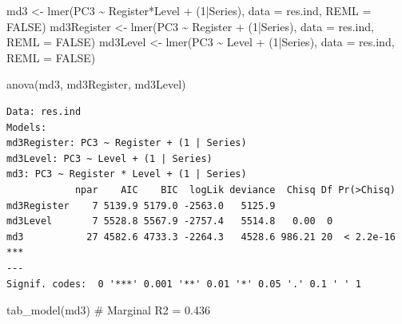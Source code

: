 \documentclass[
  letterpaper,
  DIV=11,
  numbers=noendperiod]{scrreprt}
\newenvironment{Shaded}{\begin{snugshade}}{\end{snugshade}}
\newcommand{\AttributeTok}[1]{\textcolor[rgb]{0.40,0.45,0.13}{#1}}
\newcommand{\CommentTok}[1]{\textcolor[rgb]{0.37,0.37,0.37}{#1}}
\newcommand{\ConstantTok}[1]{\textcolor[rgb]{0.56,0.35,0.01}{#1}}
\newcommand{\DecValTok}[1]{\textcolor[rgb]{0.68,0.00,0.00}{#1}}
\newcommand{\FunctionTok}[1]{\textcolor[rgb]{0.28,0.35,0.67}{#1}}
\newcommand{\NormalTok}[1]{\textcolor[rgb]{0.00,0.23,0.31}{#1}}
\newcommand{\OtherTok}[1]{\textcolor[rgb]{0.00,0.23,0.31}{#1}}
\newcommand{\SpecialCharTok}[1]{\textcolor[rgb]{0.37,0.37,0.37}{#1}}
\begin{document}
\begin{Shaded}
\begin{Highlighting}[]
\NormalTok{md3 }\OtherTok{\textless{}{-}} \FunctionTok{lmer}\NormalTok{(PC3 }\SpecialCharTok{\textasciitilde{}}\NormalTok{ Register}\SpecialCharTok{*}\NormalTok{Level }\SpecialCharTok{+}\NormalTok{ (}\DecValTok{1}\SpecialCharTok{|}\NormalTok{Series), }\AttributeTok{data =}\NormalTok{ res.ind, }\AttributeTok{REML =} \ConstantTok{FALSE}\NormalTok{)}
\NormalTok{md3Register }\OtherTok{\textless{}{-}} \FunctionTok{lmer}\NormalTok{(PC3 }\SpecialCharTok{\textasciitilde{}}\NormalTok{ Register }\SpecialCharTok{+}\NormalTok{ (}\DecValTok{1}\SpecialCharTok{|}\NormalTok{Series), }\AttributeTok{data =}\NormalTok{ res.ind, }\AttributeTok{REML =} \ConstantTok{FALSE}\NormalTok{)}
\NormalTok{md3Level }\OtherTok{\textless{}{-}} \FunctionTok{lmer}\NormalTok{(PC3 }\SpecialCharTok{\textasciitilde{}}\NormalTok{ Level }\SpecialCharTok{+}\NormalTok{ (}\DecValTok{1}\SpecialCharTok{|}\NormalTok{Series), }\AttributeTok{data =}\NormalTok{ res.ind, }\AttributeTok{REML =} \ConstantTok{FALSE}\NormalTok{)}

\FunctionTok{anova}\NormalTok{(md3, md3Register, md3Level)}
\end{Highlighting}
\end{Shaded}

\begin{verbatim}
Data: res.ind
Models:
md3Register: PC3 ~ Register + (1 | Series)
md3Level: PC3 ~ Level + (1 | Series)
md3: PC3 ~ Register * Level + (1 | Series)
            npar    AIC    BIC  logLik deviance  Chisq Df Pr(>Chisq)    
md3Register    7 5139.9 5179.0 -2563.0   5125.9                         
md3Level       7 5528.8 5567.9 -2757.4   5514.8   0.00  0               
md3           27 4582.6 4733.3 -2264.3   4528.6 986.21 20  < 2.2e-16 ***
---
Signif. codes:  0 '***' 0.001 '**' 0.01 '*' 0.05 '.' 0.1 ' ' 1
\end{verbatim}

\begin{Shaded}
\begin{Highlighting}[]
\FunctionTok{tab\_model}\NormalTok{(md3) }\CommentTok{\# Marginal R2 = 0.436}
\end{Highlighting}
\end{Shaded}
\end{document}
